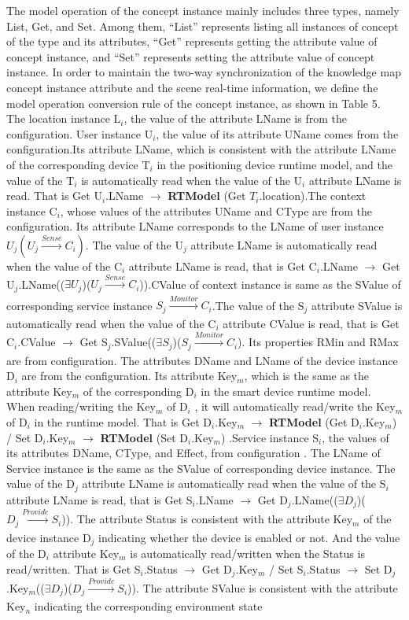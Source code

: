 The model operation of the concept instance mainly includes three types, namely List, Get, and Set. Among them, “List” represents listing all instances of concept of the type and its attributes, “Get” represents getting the attribute value of concept instance, and “Set” represents setting the attribute value of concept instance. In order to maintain the two-way synchronization of the knowledge map concept instance attribute and the scene real-time information, we define the model operation conversion rule of the concept instance, as shown in Table 5. The location instance L$_{i}$, the value of the attribute LName is from the configuration. User instance U$_{i}$, the value of its attribute UName comes from the configuration.Its attribute LName, which is consistent with the attribute LName of the corresponding device T$_{i}$ in the positioning device runtime model, and the value of the T$_{i}$ is automatically read when the value of the U$_{i}$ attribute LName is read. That is Get U$_{i}$.LName $\to$ \textbf{RTModel} (Get $T_{i}$.location).The context instance C$_{i}$, whose values of the attributes UName and CType are from the configuration. Its attribute LName corresponds to the LName of user instance $U_{j} (U_{j}\xrightarrow[]{Sense} C_{i})$. The value of the U$_{j}$ attribute LName is automatically read when the value of the C$_{i}$ attribute LName is read, that is Get C$_{i}$.LName $\to$ Get U$_{j}$.LName(($\exists U_{j}$)($U_{j}\xrightarrow[]{Sense} C_{i}$)).CValue of context instance is same as the SValue of corresponding service instance $S_{j}\xrightarrow[]{Monitor}C_{i}$.The value of the S$_{j}$ attribute SValue is automatically read when the value of the C$_{i}$ attribute CValue is read, that is Get C$_{i}$.CValue $\to$ Get S$_{j}$.SValue(($\exists S_{j}$)($S_{j}\xrightarrow[]{Monitor}C_{i}$). Its properties RMin and RMax are from configuration. The attributes DName and LName of the device instance D$_{i}$ are from the configuration. Its attribute Key$_{m}$, which is the same as the attribute Key$_{m}$ of the corresponding D$_{i}$ in the smart device runtime model. When reading/writing the Key$_{m}$ of D$_{i}$ , it will automatically read/write the Key$_{m}$ of D$_{i}$ in the runtime model. That is Get D$_{i}$.Key$_{m}$ $\to$ \textbf{RTModel} (Get D$_{i}$.Key$_{m}$) / Set D$_{i}$.Key$_{m}$ $\to$ \textbf{RTModel} (Set D$_{i}$.Key$_{m}$) .Service instance S$_{i}$, the values of its attributes DName, CType, and Effect, from configuration . The LName of Service instance is the same as the SValue of corresponding device instance. The value of the D$_{j}$ attribute LName is automatically read when the value of the S$_{i}$ attribute LName is read, that is Get S$_{i}$.LName $\to$ Get D$_{j}$.LName(($\exists D_{j}$)($D_{j}\xrightarrow[]{Provide} S_{i}$)). The attribute Status is consistent with the attribute Key$_{m}$ of the device instance D$_{j}$ indicating whether the device is enabled or not. And the value of the D$_{i}$ attribute Key$_{m}$ is automatically read/written when the Status is read/written. That is Get S$_{i}$.Status $\to$ Get D$_{j}$.Key$_{m}$ / Set S$_{i}$.Status $\to$ Set D$_{j}$.Key$_{m}$(($\exists D_{j}$)($D_{j}\xrightarrow[]{Provide} S_{i}$)). The attribute SValue is consistent with the attribute Key$_{n}$ indicating the corresponding environment state 